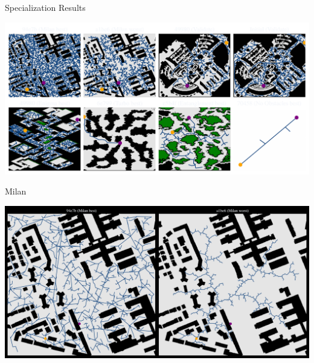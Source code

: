 \documentclass[aspectratio=169]{beamer}
\begin{document}
\begin{frame}{Specialization Results}
    
    
    \includegraphics[width=1.0\linewidth, keepaspectratio]{figures/learned.pdf}
\end{frame}

\begin{frame}{Milan}
    
    \includegraphics[width=1.0\linewidth, keepaspectratio]{figures/learned_split_0.pdf}
\end{frame}
\end{document}
